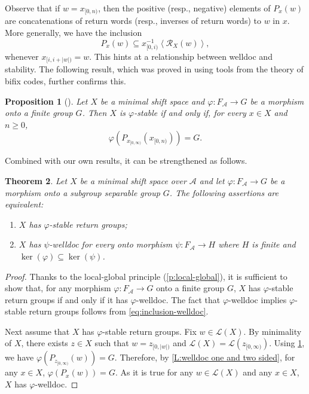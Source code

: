 \documentclass{amsart}
\newcommand*{\ret}{\mathcal{R}}
\newcommand*{\lang}{\mathcal{L}}
\newcommand*{\cA}{\mathcal{A}}
\newcommand*{\from}{\colon}
\newcommand*{\gen}[1]{\left\langle #1\right\rangle}
\theoremstyle{plain}
\newtheorem{theorem}{Theorem}
\newtheorem{proposition}[theorem]{Proposition}
\theoremstyle{definition}
\theoremstyle{remark}
\begin{document}
Observe that if $w = x_{[0,n)}$, then the positive (resp., negative) elements of $P_x(w)$ are concatenations of return words (resp., inverses of return words) to $w$ in $x$. More generally, we have the inclusion
\begin{equation}\label{eq:inclusion-welldoc}
    P_x(w) \subseteq x_{[0,i)}^{-1}\gen{\ret_X(w)},
\end{equation}
whenever $x_{[i,i+|w|)}=w$.
This hints at a relationship between welldoc and stability. The following result, which was proved in \cite{pre/Berthe2024} using tools from the theory of bifix codes, further confirms this.

\begin{proposition}[{\cite[Theorem 6.1]{pre/Berthe2024}}]\label{p:welldoc berthe et al}
    Let $X$ be a minimal shift space and $\varphi\from F_\cA\to G$ be a morphism onto a finite group $G$. Then $X$ is $\varphi$-stable if and only if, for every $x\in X$ and $n\geq 0$,
    \begin{equation*}
        \varphi(P_{x_{[0,\infty)}}(x_{[0,n)})) = G.
    \end{equation*}
\end{proposition}

Combined with our own results, it can be strengthened as follows.
\begin{theorem}\label{t:welldoc}
    Let $X$ be a minimal shift space over $\cA$ and let $\varphi\from F_\cA\to G$ be a morphism onto a subgroup separable group $G$. The following assertions are equivalent:
    \begin{enumerate}
        \item $X$ has $\varphi$-stable return groups;
        \item $X$ has $\psi$-welldoc for every onto morphism $\psi\from F_\cA\to H$ where $H$ is finite and $\ker(\varphi)\subseteq\ker(\psi)$.
    \end{enumerate}
\end{theorem}

\begin{proof}
    Thanks to the local-global principle (\cref{p:local-global}), it is sufficient to show that, for any morphism $\varphi\from F_\cA \to G$ onto a finite group $G$, $X$ has $\varphi$-stable return groups if and only if it has $\varphi$-welldoc.
    The fact that $\varphi$-welldoc implies $\varphi$-stable return groups follows from \eqref{eq:inclusion-welldoc}.    
    
    Next assume that $X$ has $\varphi$-stable return groups. Fix $w\in\lang(X)$.
    By minimality of $X$, there exists $z \in X$ such that $w = z_{[0,|w|)}$ and $\lang(X) = \lang(z_{[0,\infty)})$. Using \cref{p:welldoc berthe et al}, we have $\varphi(P_{z_{[0,\infty)}}(w)) = G$. 
    Therefore, by \cref{L:welldoc one and two sided}, for any $x \in X$, $\varphi(P_x(w)) = G$. As it is true for any $w \in \lang(X)$ and any $x \in X$, $X$ has $\varphi$-welldoc.
\end{proof}
\end{document}
